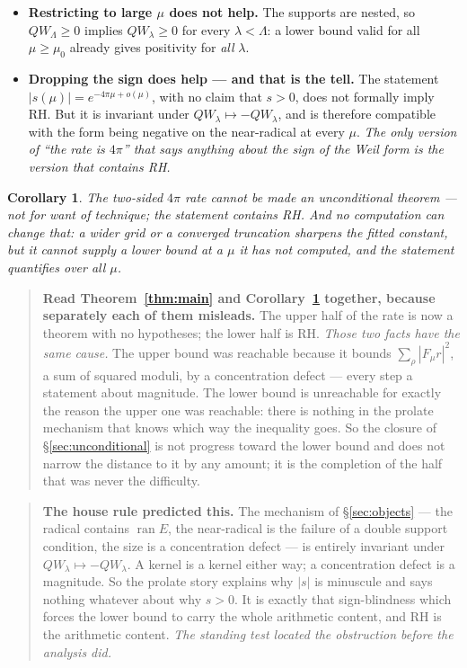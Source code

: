 \documentclass[11pt,a4paper]{article}
\theoremstyle{plain}
\newtheorem{corollary}[theorem]{Corollary}
\theoremstyle{definition}
\theoremstyle{remark}
\newcommand{\R}{\mathbb{R}}
\newcommand{\Z}{\mathbb{Z}}
\newcommand{\Q}{\mathbb{Q}}
\newcommand{\A}{\mathbb{A}}
\newcommand{\E}{\mathcal{E}}
\newcommand{\F}{\mathcal{F}}
\newcommand{\QW}{QW}
\def\QW{QW}\def\E{E}\def\F{F}\def\R{R}\def\Q{Q}\def\Z{Z}\def\A{A}%
\begin{document}
\begin{itemize}\itemsep3pt
\item \textbf{Restricting to large $\mu$ does not help.}  The supports are
nested, so $\QW_\Lambda\ge0$ implies $\QW_\lambda\ge0$ for every
$\lambda<\Lambda$: a lower bound valid for all $\mu\ge\mu_0$ already gives
positivity for \emph{all} $\lambda$.
\item \textbf{Dropping the sign does help --- and that is the tell.}  The
statement $|s(\mu)|=e^{-4\pi\mu+o(\mu)}$, with no claim that $s>0$, does not
formally imply RH.  But it is invariant under $\QW_\lambda\mapsto-\QW_\lambda$,
and is therefore compatible with the form being negative on the near-radical at
every $\mu$.  \emph{The only version of ``the rate is $4\pi$'' that says anything
about the sign of the Weil form is the version that contains RH.}
\end{itemize}

\begin{corollary}\label{cor:permanent}
The \emph{two-sided} $4\pi$ rate cannot be made an unconditional theorem --- not
for want of technique; the statement contains RH.  And no computation can change
that: a wider grid or a converged truncation sharpens the fitted constant, but it
cannot supply a lower bound at a $\mu$ it has not computed, and the statement
quantifies over all $\mu$.
\end{corollary}

\begin{quote}
\textbf{Read Theorem~\ref{thm:main} and Corollary~\ref{cor:permanent} together,
because separately each of them misleads.}  The upper half of the rate is now a
theorem with no hypotheses; the lower half is RH.  \emph{Those two facts have the
same cause.}  The upper bound was reachable because it bounds
$\sum_\rho|\F_\mu r|^2$, a sum of squared moduli, by a concentration defect ---
every step a statement about magnitude.  The lower bound is unreachable for
exactly the reason the upper one was reachable: there is nothing in the prolate
mechanism that knows which way the inequality goes.  So the closure of
\S\ref{sec:unconditional} is not progress toward the lower bound and does not
narrow the distance to it by any amount; it is the completion of the half that
was never the difficulty.
\end{quote}

\begin{quote}
\textbf{The house rule predicted this.}  The mechanism of \S\ref{sec:objects}
--- the radical contains $\operatorname{ran}\E$, the near-radical is the failure
of a double support condition, the size is a concentration defect --- is entirely
invariant under $\QW_\lambda\mapsto-\QW_\lambda$.  A kernel is a kernel either
way; a concentration defect is a magnitude.  So the prolate story explains why
$|s|$ is minuscule and says nothing whatever about why $s>0$.  It is exactly that
sign-blindness which forces the lower bound to carry the whole arithmetic
content, and RH is the arithmetic content.  \emph{The standing test located the
obstruction before the analysis did.}
\end{quote}
\end{document}
